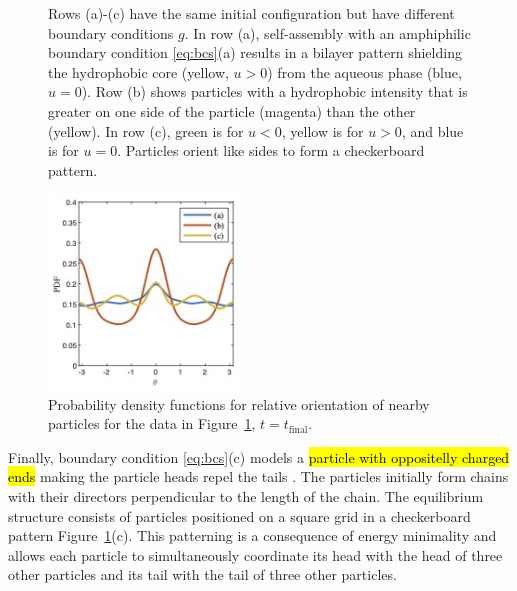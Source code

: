 \begin{figure}[h!]
  \caption{\footnotesize
    \label{fig:self-assembly}
    Rows (a)-(c) have the same initial configuration
    but have different boundary conditions $g.$ 
    In row (a), self-assembly with an amphiphilic boundary
    condition \eqref{eq:bcs}(a) results in a bilayer pattern shielding
    the hydrophobic core (yellow, $u > 0$) from the aqueous phase (blue, $u = 0$).
    Row (b) shows particles with a hydrophobic intensity that is
    greater on one side of the particle (magenta) than the other (yellow).
    In row (c), green is for $u < 0$, yellow is for $u > 0$, and blue is for $u = 0$.
    Particles orient like sides to form a checkerboard pattern.\\
  }
\end{figure}

\begin{figure}
  \vspace{-4pt}
  \centering
  \includegraphics[width=2in]{figures/SpecificAim1/OrderPDFs.jpg} 
  \vspace{-20pt}
  \caption{\footnotesize
    \label{fig:OrderPDFs}
    Probability density functions for
    relative orientation of nearby particles
    for the data in 
    Figure~\ref{fig:self-assembly}, $t = t_{\text{final}}$.
  }
\end{figure}
Finally, boundary condition \eqref{eq:bcs}(c) models 
a \hl{particle with oppositelly charged ends} making the 
particle heads repel the tails \cite{MaRa76, Ma77}.
The particles initially form chains with their directors perpendicular to the
length of the chain. The equilibrium structure consists of particles
positioned on a square grid in a checkerboard pattern
Figure~\ref{fig:self-assembly}(c). This patterning is a consequence of
energy minimality and allows each particle to simultaneously coordinate
its head with the head of three other particles and its tail with the
tail of three other particles. 

